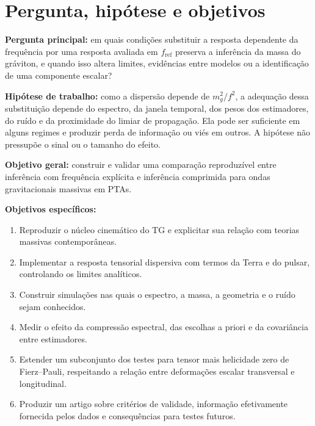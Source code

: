 \chapter{Pergunta, hipótese e objetivos}\label{pergunta-hipuxf3tese-e-objetivos}

\textbf{Pergunta principal:} em quais condições substituir a resposta
dependente da frequência por uma resposta avaliada em
\(f_{\mathrm{ref}}\) preserva a inferência da massa do gráviton, e
quando isso altera limites, evidências entre modelos ou a identificação
de uma componente escalar?

\textbf{Hipótese de trabalho:} como a dispersão depende de
\(m_g^2/f^2\), a adequação dessa substituição depende do espectro, da
janela temporal, dos pesos dos estimadores, do ruído e da proximidade do
limiar de propagação. Ela pode ser suficiente em alguns regimes e
produzir perda de informação ou viés em outros. A hipótese não pressupõe
o sinal ou o tamanho do efeito.

\textbf{Objetivo geral:} construir e validar uma comparação reproduzível
entre inferência com frequência explícita e inferência comprimida para
ondas gravitacionais massivas em PTAs.

\textbf{Objetivos específicos:}

\begin{enumerate}
\def\labelenumi{\arabic{enumi}.}
\tightlist
\item
  Reproduzir o núcleo cinemático do TG e explicitar sua relação com
  teorias massivas contemporâneas.
\item
  Implementar a resposta tensorial dispersiva com termos da Terra e do
  pulsar, controlando os limites analíticos.
\item
  Construir simulações nas quais o espectro, a massa, a geometria e o
  ruído sejam conhecidos.
\item
  Medir o efeito da compressão espectral, das escolhas a priori e da
  covariância entre estimadores.
\item
  Estender um subconjunto dos testes para tensor mais helicidade zero de
  Fierz--Pauli, respeitando a relação entre deformações escalar
  transversal e longitudinal.
\item
  Produzir um artigo sobre critérios de validade, informação
  efetivamente fornecida pelos dados e consequências para testes
  futuros.
\end{enumerate}
